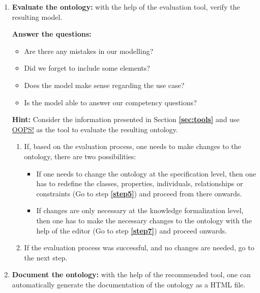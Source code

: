 \documentclass{guideline/sty/rapport}
\begin{document}
\begin{enumerate}
\item \textcolor{sapphire}{\textbf{Evaluate the ontology:}} with the help of the evaluation tool, verify the resulting model. \label{step8}

\textbf{Answer the questions:} 
\begin{itemize}
    \item Are there any mistakes in our modelling? 
    \item Did we forget to include some elements? 
    \item Does the model make sense regarding the use case? \item Is the model able to answer our competency questions?
\end{itemize}

\begin{mdframed}[backgroundcolor=officegreen!8, linecolor=officegreen]
    \begin{minipage}[t]{1\linewidth}
    \textbf{Hint:}
      Consider the information presented in Section \textbf{\ref{sec:tools}} and use \href{https://oops.linkeddata.es}{OOPS!} as the tool to evaluate the resulting ontology.
    \end{minipage}
\end{mdframed}

\begin{enumerate}
    \item If, based on the evaluation process, one needs to make changes to the ontology, there are two possibilities:
    \begin{itemize}
        \item If one needs to change the ontology at the specification level, then one has to redefine the classes, properties, individuals, relationships or constraints (Go to step \textbf{\ref{step5}}) and proceed from there onwards.
        \item If changes are only necessary at the knowledge formalization level, then one has to make the necessary changes to the ontology with the help of the editor (Go to step \textbf{\ref{step7}}) and proceed onwards.
    \end{itemize}
	\item If the evaluation process was successful, and no changes are needed, go to the next step.
\end{enumerate}

\item \textcolor{sapphire}{\textbf{Document the ontology:}} with the help of the recommended tool, one can automatically generate the documentation of the ontology as a HTML file. \label{step9}


\end{enumerate}
\end{document}
